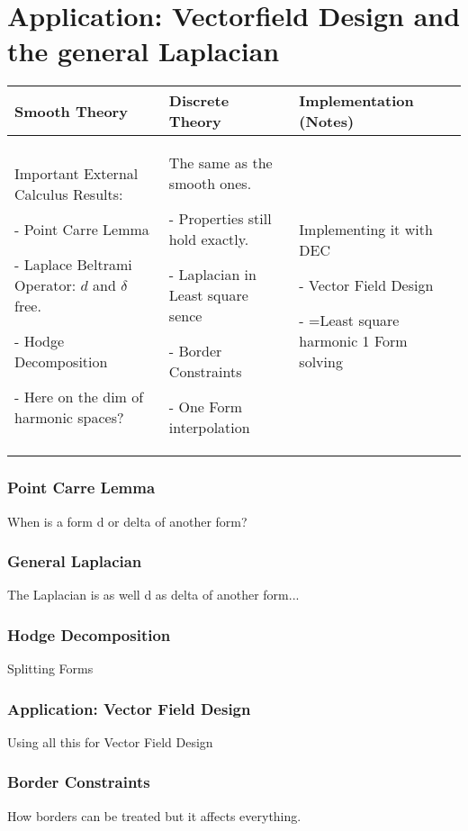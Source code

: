 \chapter{Application: Vectorfield Design and the general Laplacian}
	\begin{longtable}{|p{4.5cm}|p{4.5cm}|p{4.5cm}|}
		\hline
		Smooth Theory& Discrete Theory& Implementation (Notes)\\
		\hline
			Important External Calculus Results:
			\begin{packed_enum}
				\item[-] Point Carre Lemma
				\item[-] Laplace Beltrami Operator: $d$ and $\delta$ free.
				\item[-] Hodge Decomposition
				\item[-] Here on the dim of harmonic spaces?
			\end{packed_enum}
			&
			The same as the smooth ones.
			\begin{packed_enum}
				\item[-] Properties still hold exactly.
				\item[-] Laplacian in Least square sence
				\item[-] Border Constraints
				\item[-] One Form interpolation
			\end{packed_enum}
			 & 
			 Implementing it with DEC
			 \begin{packed_enum}
				\item[-] Vector Field Design
				\item[-] =Least square harmonic 1 Form solving
			\end{packed_enum}
			 \\		
		\hline
	\end{longtable}
	\subsection{Point Carre Lemma}
	When is a form d or delta of another form?
	\subsection{General Laplacian}
	The Laplacian is as well d as delta of another form...
	\subsection{Hodge Decomposition}
	Splitting Forms
	\subsection{Application: Vector Field Design}
	Using all this for Vector Field Design
	\subsection{Border Constraints}
	How borders can be treated but it affects everything.